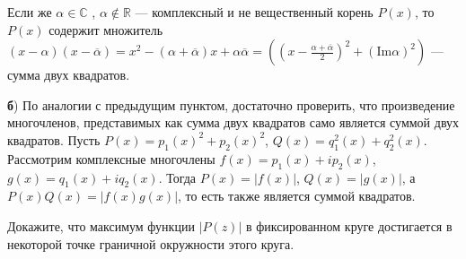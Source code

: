 \documentclass[a4paper, 12pt]{article}
\begin{document}
Если же $\alpha \in \mathbb{C}$ , $\alpha \not \in \mathbb{R}$ --- комплексный и не вещественный корень $P(x)$, то $P(x)$ содержит множитель $(x-\alpha)(x-\overline{\alpha}) = x^2-(\alpha+\overline{\alpha})x+\alpha\overline{\alpha}=((x-\frac{\alpha+\overline{\alpha}}{2})^2+(\mathrm{Im} \alpha)^2)$ --- сумма двух квадратов.


\textbf{б}) По аналогии с предыдущим пунктом, достаточно проверить, что произведение многочленов, представимых как сумма двух квадратов само является суммой двух квадратов. Пусть $P(x)=p_1(x)^2 + p_2(x)^2$, $Q(x) = q_1^2(x) + q_2^2(x)$. Рассмотрим комплексные многочлены $f(x) = p_1(x)+ip_2(x)$, $g(x) = q_1(x)+iq_2(x)$. Тогда $P(x)=|f(x)|$, $Q(x)=|g(x)|$, а $P(x)Q(x)=|f(x)g(x)|$, то есть также является суммой квадратов.














Докажите, что максимум функции $|P(z)|$ в фиксированном круге достигается в некоторой точке
граничной окружности этого круга.

\end{document}
